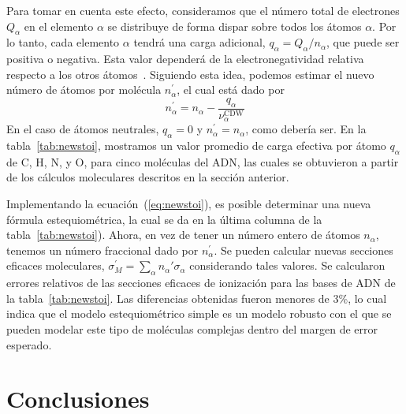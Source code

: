 Para tomar en cuenta este efecto, consideramos que el número total de 
electrones $Q_{\alpha }$ en el elemento $\alpha$ se distribuye de forma
dispar sobre todos los átomos $\alpha$. Por lo tanto, cada elemento  
$\alpha$ tendrá una carga adicional, $q_{\alpha}=Q_{\alpha}/n_{\alpha}$, 
que puede ser positiva o negativa. Esta valor dependerá de la 
electronegatividad relativa respecto a los otros átomos~\cite{rappe1991}. 
Siguiendo esta idea, podemos estimar el nuevo número de átomos por 
molécula $n_{\alpha }^{\prime }$, el cual está dado por
\begin{equation}
n_{\alpha }^{\prime }=n_{\alpha }-
\frac{q_{\alpha }}{\nu_{\alpha }^{\text{CDW}}}
\label{eq:newstoi}
\end{equation}
En el caso de átomos neutrales, $q_{\alpha}=0$ y 
$n_{\alpha}^{\prime}=n_{\alpha}$, como debería ser. En la 
tabla~\ref{tab:newstoi}, mostramos un valor promedio de carga efectiva por
átomo $q_{\alpha}$ de C, H, N, y O, para cinco moléculas del ADN,
las cuales se obtuvieron a partir de los cálculos moleculares descritos 
en la sección anterior.

Implementando la ecuación~(\ref{eq:newstoi}), es posible determinar
una nueva fórmula estequiométrica, la cual se da en la última columna de
la tabla~\ref{tab:newstoi}). Ahora, en vez de tener un número entero 
de átomos $n_{\alpha}$, tenemos un número fraccional dado por 
$n_{\alpha}^{\prime}$. Se pueden calcular nuevas secciones eficaces 
moleculares, $\sigma^{\prime}_{M}=\sum_{\alpha}n_{\alpha}'\sigma_{\alpha}$
considerando tales valores. Se calcularon errores relativos de las 
secciones eficaces de ionización para las bases de ADN de la 
tabla~\ref{tab:newstoi}. Las diferencias obtenidas fueron menores de
3\%, lo cual indica que el modelo estequiométrico simple 
es un modelo robusto con el que se pueden modelar este tipo de 
moléculas complejas dentro del margen de error esperado.

\section{Conclusiones}

